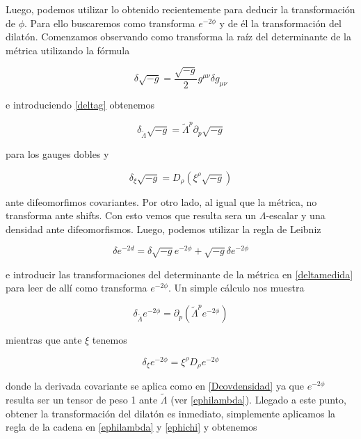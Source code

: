\documentclass{article}
\numberwithin{equation}{section}
\begin{document}
\vspace{.5cm}

Luego, podemos utilizar lo obtenido recientemente para deducir la transformación de $ \phi $. Para ello buscaremos como transforma $ e^{-2\phi} $ y de él la transformación del dilatón. Comenzamos observando como transforma la raíz del determinante de la métrica utilizando la fórmula
 
\begin{equation}
\delta \sqrt{-g} = \frac{\sqrt{-g}}{2} g^{\mu \nu} \delta g_{\mu \nu}
\end{equation}
 
e introduciendo \ref{deltag} obtenemos
 
\begin{equation}
\delta_{\widetilde{\Lambda}} \sqrt{-g} = \widetilde{\Lambda}^p \partial_p \sqrt{-g} 
\end{equation}
 
para los gauges dobles y
 
\begin{equation}
\delta_{\xi} \sqrt{-g} = D_{\rho} \left( \xi^{\rho} \sqrt{-g} \right) 
\end{equation}
 
ante difeomorfimos covariantes. Por otro lado, al igual que la métrica, no transforma ante shifts. Con esto vemos que resulta sera un $ \Lambda$-escalar y una densidad ante difeomorfismos. Luego, podemos utilizar la regla de Leibniz 

\begin{equation}\label{medidaauxiliar2}
\delta e^{-2 d} = \delta \sqrt{-g} e^{-2 \phi} + \sqrt{-g} \delta e^{-2 \phi}
\end{equation}

e introducir las transformaciones del determinante de la métrica en \ref{deltamedida} para leer de allí como transforma $ e^{-2 \phi} $. Un simple cálculo nos muestra

\begin{equation}\label{ephilambda}
\delta_{\widetilde{\Lambda}} e^{-2 \phi} = \partial_p \left( \widetilde{\Lambda}^p e^{-2 \phi}\right)
\end{equation}

mientras que ante $ \xi $ tenemos

\begin{equation}\label{ephichi}
\delta_{\xi} e^{-2 \phi} = \xi^{\rho} D_{\rho} e^{-2 \phi}
\end{equation}

donde la derivada covariante se aplica como en \ref{Dcovdensidad} ya que $ e^{-2\phi} $ resulta ser un tensor de peso 1 ante $ \widetilde{\Lambda} $ (ver \ref{ephilambda}). Llegado a este punto, obtener la transformación del dilatón es inmediato, simplemente aplicamos la regla de la cadena en \ref{ephilambda} y \ref{ephichi} y obtenemos
\end{document}
